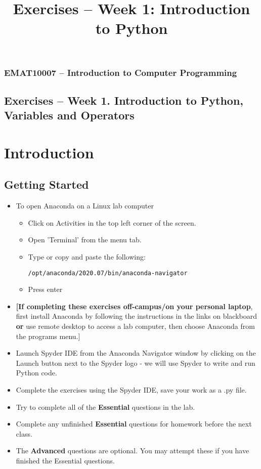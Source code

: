 \documentclass[12pt]{article}
\begin{document}
\title{Exercises -- Week 1: Introduction to Python}
\subsubsection*{EMAT10007 -- Introduction to Computer Programming}
\subsection*{\Large Exercises -- Week 1. Introduction to Python, Variables and Operators}

\section*{Introduction}

\subsection*{Getting Started}

\begin{itemize}

    
    \item{To open Anaconda on a Linux lab computer
    
    \begin{itemize}
        \item{Click on Activities in the top left corner of the screen.}
        \item{Open 'Terminal' from the menu tab.}
        \item{Type or copy and paste the following:  
        
        \vspace{0.5em}
		{\tt /opt/anaconda/2020.07/bin/anaconda-navigator}
	    \vspace{0.5em}
	    }
	    \item{Press enter}
    \end{itemize}
    }
    
    \item{{\bf [If completing these exercises off-campus/on your personal laptop}, first install Anaconda by following the instructions in the links on blackboard {\bf or} use remote desktop to access a lab computer, then choose Anaconda from the programs menu.]} 

    \item{Launch Spyder IDE from the Anaconda Navigator window by clicking on the Launch button next to the Spyder logo - we will use Spyder to write and run Python code.}
    \item{Complete the exercises using the Spyder IDE, save your work as a .py file.}
    \item{Try to complete all of the {\bf Essential} questions in the lab.}
    \item{Complete any unfinished {\bf Essential} questions for homework before the next class.}
    \item{The {\bf Advanced} questions are optional. You may attempt these if you have finished the Essential questions.}
\end{itemize}
\end{document}
